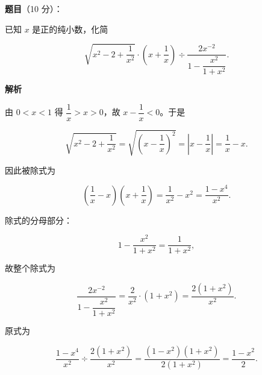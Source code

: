 \begin{answer}

\textbf{题目}（10 分）：

已知 $x$ 是正的纯小数，化简

\nopagebreak[4]
\[
\sqrt{x^{2}-2+\frac{1}{x^{2}}}\cdot\left(x+\frac{1}{x}\right)\div\frac{2x^{-2}}{1-\dfrac{x^{2}}{1+x^{2}}}.
\]

\textbf{解析}

由 $0<x<1$ 得 $\dfrac{1}{x}>x>0$，故 $x-\dfrac{1}{x}<0$。于是

\nopagebreak[4]
\[
\sqrt{x^{2}-2+\frac{1}{x^{2}}}
=\sqrt{\left(x-\frac{1}{x}\right)^{2}}
=\left|x-\frac{1}{x}\right|
=\frac{1}{x}-x.
\]

因此被除式为

\nopagebreak[4]
\[
\left(\frac{1}{x}-x\right)\left(x+\frac{1}{x}\right)
=\frac{1}{x^{2}}-x^{2}
=\frac{1-x^{4}}{x^{2}}.
\]

除式的分母部分：

\nopagebreak[4]
\[
1-\frac{x^{2}}{1+x^{2}}=\frac{1}{1+x^{2}},
\]

故整个除式为

\nopagebreak[4]
\[
\frac{2x^{-2}}{1-\dfrac{x^{2}}{1+x^{2}}}
=\frac{2}{x^{2}}\cdot(1+x^{2})
=\frac{2(1+x^{2})}{x^{2}}.
\]

原式为

\nopagebreak[4]
\[
\frac{1-x^{4}}{x^{2}}\div\frac{2(1+x^{2})}{x^{2}}
=\frac{(1-x^{2})(1+x^{2})}{2(1+x^{2})}
=\frac{1-x^{2}}{2}.
\]


\end{answer}
